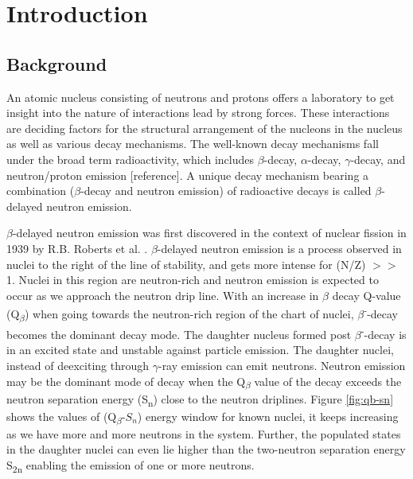 \chapter{Introduction} \label{ch:introduction}

\section{Background}
An atomic nucleus consisting of neutrons and protons offers a laboratory to get insight into the nature of interactions lead by strong forces. These interactions are deciding factors for the structural arrangement of the nucleons in the nucleus as well as various decay mechanisms. The well-known decay mechanisms fall under the broad term radioactivity, which includes $\beta$-decay, $\alpha$-decay, $\gamma$-decay, and neutron/proton emission [reference]. A unique decay mechanism bearing a combination ($\beta$-decay and neutron emission) of radioactive decays  is called $\beta$-delayed neutron emission.

$\beta$-delayed neutron emission was first discovered in the context of nuclear fission in 1939 by R.B. Roberts et al. \citep{robert1939}. $\beta$-delayed neutron emission is a process observed in nuclei to the right of the line of stability, and gets more intense for (N/Z) $>>$ 1. Nuclei in this region are neutron-rich and neutron emission is expected to occur as we approach the neutron drip line. With an increase in $\beta$ decay Q-value (Q{\textsubscript{$\beta$}}) when going towards the neutron-rich region of the chart of nuclei, $\beta$\textsuperscript{-}-decay becomes the dominant decay mode. The daughter nucleus formed post $\beta$\textsuperscript{-}-decay is in an excited state and unstable against particle emission. The daughter nuclei, instead of deexciting through $\gamma$-ray emission can emit neutrons. Neutron emission may be the dominant mode of decay when the Q{\textsubscript{$\beta$}} value of the decay exceeds the neutron separation energy (S\textsubscript{n}) close to the neutron driplines. Figure \ref{fig:qb-sn} shows the values of (Q{\textsubscript{$\beta$}}-$S_{n}$) energy window for known nuclei, it keeps increasing as we have more and more neutrons in the system. Further, the populated states in the daughter nuclei can even lie higher than the two-neutron separation energy S\textsubscript{2n} enabling the emission of one or more neutrons.   

